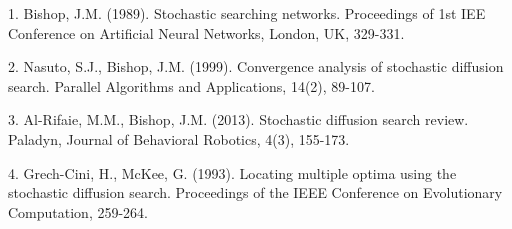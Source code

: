 \documentclass{article}
\newcommand{\1}{\mathds{1}}
\begin{document}
\noindent\hrulefill

1. Bishop, J.M. (1989). Stochastic searching networks. Proceedings of 1st IEE Conference on Artificial Neural Networks, London, UK, 329-331.

2. Nasuto, S.J., Bishop, J.M. (1999). Convergence analysis of stochastic diffusion search. Parallel Algorithms and Applications, 14(2), 89-107.

3. Al-Rifaie, M.M., Bishop, J.M. (2013). Stochastic diffusion search review. Paladyn, Journal of Behavioral Robotics, 4(3), 155-173.

4. Grech-Cini, H., McKee, G. (1993). Locating multiple optima using the stochastic diffusion search. Proceedings of the IEEE Conference on Evolutionary Computation, 259-264.
\end{document}
